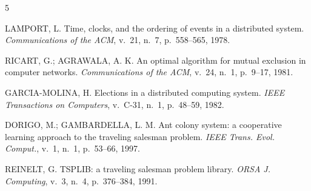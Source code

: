 
\begin{thebibliography}{5}
\setlength{\itemsep}{2pt}

LAMPORT, L. Time, clocks, and the ordering of events in a distributed system.
\emph{Communications of the ACM}, v.~21, n.~7, p.~558--565, 1978.

RICART, G.; AGRAWALA, A. K. An optimal algorithm for mutual exclusion in computer networks.
\emph{Communications of the ACM}, v.~24, n.~1, p.~9--17, 1981.

GARCIA-MOLINA, H. Elections in a distributed computing system.
\emph{IEEE Transactions on Computers}, v.~C-31, n.~1, p.~48--59, 1982.

DORIGO, M.; GAMBARDELLA, L. M. Ant colony system: a cooperative learning approach to the
traveling salesman problem. \emph{IEEE Trans. Evol. Comput.}, v.~1, n.~1, p.~53--66, 1997.

REINELT, G. TSPLIB: a traveling salesman problem library.
\emph{ORSA J. Computing}, v.~3, n.~4, p.~376--384, 1991.

\end{thebibliography}
